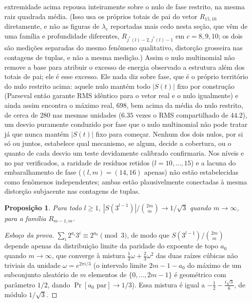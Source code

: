 \documentclass[11pt]{amsart}
\theoremstyle{plain}
\newtheorem{proposition}[theorem]{Proposi\c{c}\~ao}
\theoremstyle{definition}
\theoremstyle{remark}
\begin{document}
extremidade acima repousa inteiramente sobre o nulo de fase restrito, na mesma raiz quadrada média.
(Isso usa os próprios totais de pai do vetor $R_{15,16}$ diretamente, e não as figuras de
$\lambda_c$ reportadas mais cedo nesta seção, que vêm de uma família e profundidade diferentes,
$R_{j^*(l)-2,j^*(l)-1}$ em $c=8,9,10$; os dois são medições separadas do mesmo fenômeno
qualitativo, distorção grosseira nas contagens de tuplas, e não a mesma medição.) Assim o nulo
multinomial não remove a base para atribuir o excesso de energia observado a estrutura além dos
totais de pai; ele é esse excesso. Ele nada diz sobre fase, que é o próprio território do nulo
restrito acima: aquele nulo mantém todo $|S(t)|$ fixo por construção (Parseval então garante RMS
idêntico para o vetor real e o nulo igualmente) e ainda assim encontra o máximo real, $698$, bem
acima da média do nulo restrito, de cerca de $280$ nas mesmas unidades ($6.35$ vezes o RMS
compartilhado de $44.2$), um desvio puramente conduzido por fase que o nulo multinomial não pode
tratar já que nunca mantém $|S(t)|$ fixo para começar. Nenhum dos dois nulos, por si só ou juntos,
estabelece qual mecanismo, se algum, decide a cobertura, ou o quanto de cada desvio um teste
devidamente calibrado confirmaria. Nos níveis e no par verificados, a raridade de resíduos retidos
($l=10,\dots,15$) e a lacuna do embaralhamento de fase ($(l,m)=(14,16)$ apenas) não estão
estabelecidas como fenômenos independentes; ambas estão plausivelmente conectadas à mesma distorção
subjacente nas contagens de tuplas.

\begin{proposition}
\label{prop:1547}
Para todo $l\ge1$, $|S(3^{l-1})|/\binom{2m}{m} \to 1/\sqrt3$ quando $m\to\infty$, para a família
$R_{m-1,m}$.
\end{proposition}

\begin{proof}[Esboço da prova]
$\sum_i 2^{a_i}3^i \equiv 2^{a_0} \pmod 3$, de modo que $S(3^{l-1})/\binom{2m}{m}$ depende apenas
da distribuição limite da paridade do expoente de topo $a_0$ quando $m\to\infty$, que converge à
mistura $\tfrac13\omega + \tfrac23\omega^2$ das duas raízes cúbicas não triviais da unidade
$\omega=e^{2\pi i/3}$ (o intervalo limite $2m-1-a_0$ do máximo de um subconjunto aleatório de $m$
elementos de $\{0,\dots,2m-1\}$ é geométrico com parâmetro $1/2$, dando
$\Pr[a_0\text{ par}]\to1/3$). Essa mistura é igual a $-\tfrac12 - \tfrac{i\sqrt3}6$, de módulo
$1/\sqrt3$.
\end{proof}
\end{document}

